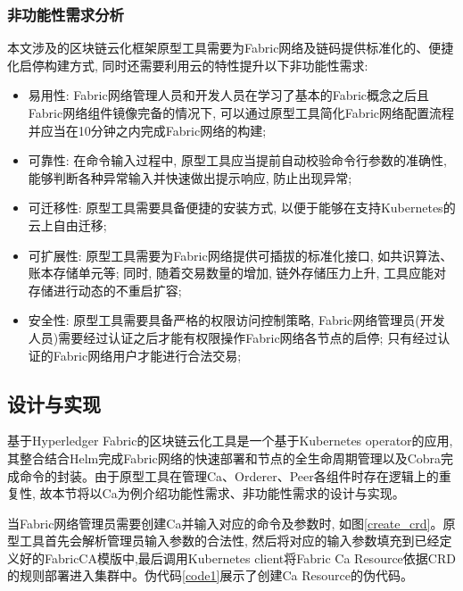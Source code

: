 \subsubsection{非功能性需求分析}

本文涉及的区块链云化框架原型工具需要为Fabric网络及链码提供标准化的、便捷化启停构建方式, 同时还需要利用云的特性提升以下非功能性需求:

\begin{itemize}[itemindent=2em]
    \item 易用性: Fabric网络管理人员和开发人员在学习了基本的Fabric概念之后且Fabric网络组件镜像完备的情况下, 可以通过原型工具简化Fabric网络配置流程并应当在10分钟之内完成Fabric网络的构建;

    \item 可靠性: 在命令输入过程中, 原型工具应当提前自动校验命令行参数的准确性, 能够判断各种异常输入并快速做出提示响应, 防止出现异常;

    \item 可迁移性: 原型工具需要具备便捷的安装方式, 以便于能够在支持Kubernetes的云上自由迁移;

    \item 可扩展性: 原型工具需要为Fabric网络提供可插拔的标准化接口, 如共识算法、账本存储单元等; 同时, 随着交易数量的增加, 链外存储压力上升, 工具应能对存储进行动态的不重启扩容;

    \item 安全性: 原型工具需要具备严格的权限访问控制策略, Fabric网络管理员(开发人员)需要经过认证之后才能有权限操作Fabric网络各节点的启停; 只有经过认证的Fabric网络用户才能进行合法交易;
\end{itemize}


\subsection{设计与实现}

基于Hyperledger Fabric的区块链云化工具是一个基于Kubernetes operator的应用, 其整合结合Helm完成Fabric网络的快速部署和节点的全生命周期管理以及Cobra\footnotemark[1]完成命令的封装。由于原型工具在管理Ca、Orderer、Peer各组件时存在逻辑上的重复性, 故本节将以Ca为例介绍功能性需求、非功能性需求的设计与实现。

当Fabric网络管理员需要创建Ca并输入对应的命令及参数时, 如图\ref{create_crd}。原型工具首先会解析管理员输入参数的合法性, 然后将对应的输入参数填充到已经定义好的FabricCA模版中,最后调用Kubernetes client将Fabric Ca Resource依据CRD的规则部署进入集群中。伪代码\ref{code1}展示了创建Ca Resource的伪代码。

